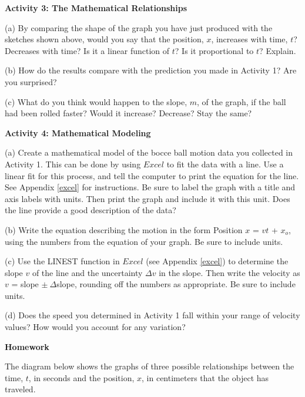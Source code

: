 \pagebreak[3]
\textbf{Activity 3: The Mathematical Relationships} 

(a) By comparing the shape of the graph you have just produced with the sketches
shown above, would you say that the position, $x$, increases with time, 
$t$? Decreases
with time? Is it a linear function of $t$? Is it proportional to $t$? Explain.
\vspace{20mm}

(b) How do the results compare with the prediction you made in Activity 1? Are
you surprised?
\vspace{20mm}

(c) What do you think would happen to the slope, $m$, of the graph, if the ball
had been rolled faster? Would it increase? Decrease? Stay the same?
\vspace{20mm}

\textbf{Activity 4: Mathematical Modeling} 

(a) Create a mathematical model of the bocce ball motion data you collected
in Activity 1. This can be done by using $Excel$ to fit the data with
a line. Use a linear fit for this process, and tell the computer to print
the equation for the line. See Appendix \ref{excel} for instructions. 
Be sure to label the graph with a title and axis labels with units. Then print
the graph and include it with this unit.
Does the line provide a good description of the data?
\answerspace{20mm}

(b) Write the equation describing the motion in the form Position $x$ = $vt$ + 
$x_{o}$, using the numbers from the equation of your graph.  Be sure to include units.
\answerspace{20mm}

(c) Use the LINEST function in $Excel$ (see Appendix \ref{excel}) to determine the slope 
$v$ of the line and the uncertainty \( \Delta  v\) in the slope.  Then write 
the velocity as $v$ = slope \( \pm \ \Delta  \)slope, rounding off the numbers as appropriate.  Be sure to include units.
\answerspace{30mm}

\pagebreak[2]
(d) Does the speed you determined in Activity 1 fall within your range of velocity values?  How would you account for any variation?
\answerspace{30mm}

\textbf{Homework} 

The diagram below shows the graphs of three possible relationships between the
time, $t$, in seconds and the position, $x$, in centimeters that the object has
traveled.

